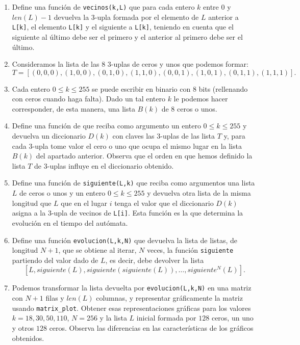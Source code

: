 \begin{ejer}
\begin{enumerate} 
\item Define  una funci\'on de {\sage} {\tt vecinos(k,L)} que para cada entero 
$k$ entre $0$ y $len(L)-1$ devuelva la $3$-upla  formada por el elemento de 
$L$ anterior a {\tt L[k]}, el elemento {\tt L[k]} y el siguiente a {\tt L[k]}, 
teniendo en cuenta que el siguiente al \'ultimo debe ser el primero y el 
anterior al primero debe ser el \'ultimo. 
\item Consideramos  la lista de las $8$  $3$-uplas de ceros y unos que podemos 
formar:
\[T=[(0, 0, 0),
 (1, 0, 0),
 (0, 1, 0),
 (1, 1, 0),
 (0, 0, 1),
 (1, 0, 1),
 (0, 1, 1),
 (1, 1, 1)].
 \]

\item Cada entero  $0\le k \le 255$ se puede escribir en binario con $8$ bits 
(rellenando con ceros cuando haga falta). Dado un tal entero $k$ le podemos 
hacer corresponder, de esta manera,  una lista $B(k)$ de $8$ ceros o unos.
\item Define   una función de {\sage}  que reciba como argumento un entero 
$0\le 
k\le 255$ y devuelva un diccionario $D(k)$ con claves las $3$-uplas de las 
lista 
$T$ y, para cada $3$-upla tome valor el cero o uno que ocupa el mismo lugar en 
la lista $B(k)$ del apartado anterior. Observa que el orden en que hemos 
definido la lista $T$ de $3$-uplas influye en el diccionario obtenido. 
\item Define  una función de {\sage}  {\tt siguiente(L,k)} que reciba como 
argumentos una lista $L$ de ceros o unos y un entero $0\le k\le 255$ y devuelva 
otra lista de la misma longitud que $L$  que en el lugar $i$ tenga el valor que 
el diccionario $D(k)$ asigna a la $3$-upla de vecinos de {\tt L[i]}. Esta 
función es la que determina la evoluci\'on en el tiempo del aut\'omata.
\item Define  una función {\tt evolucion(L,k,N)} que devuelva la lista de 
listas, de longitud $N+1$,  que se obtiene al iterar, $N$ veces,  la función 
{\tt siguiente} partiendo del valor dado de $L$, es decir, debe devolver la 
lista
\[
[L,siguiente(L),siguiente(siguiente(L)),\dots,siguiente^N(L)].
\]

\item Podemos transformar la lista devuelta por {\tt evolucion(L,k,N)} en una 
matriz con $N+1$ filas y $len(L)$ columnas, y representar gr\'aficamente la 
matriz usando {\tt matrix\_plot}. Obtener esas representaciones gr\'aficas para 
los valores $k=18,30,50,110$, $N=256$ y la lista $L$ inicial formada por $128$ 
ceros, un uno y otros $128$ ceros. Observa las diferencias en las 
características de los gr\'aficos obtenidos.

 
 \end{enumerate}
\end{ejer}






